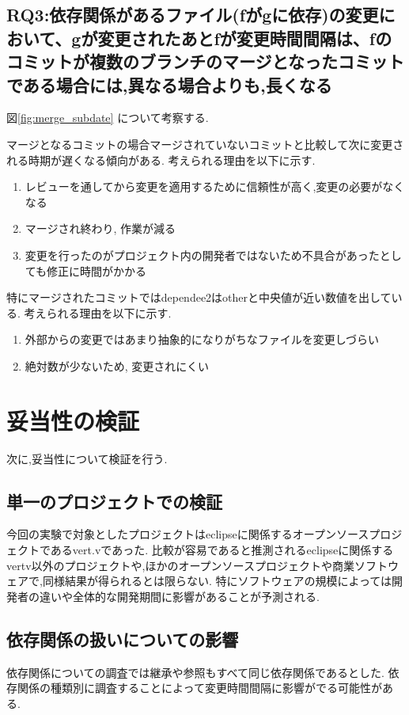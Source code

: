 \documentclass{fose2016}           %
\begin{document}
\subsection{RQ3:依存関係があるファイル(fがgに依存)の変更において、gが変更されたあとfが変更時間間隔は、fのコミットが複数のブランチのマージとなったコミットである場合には,異なる場合よりも,長くなる}
図\ref{fig:merge_subdate} について考察する.

マージとなるコミットの場合マージされていないコミットと比較して次に変更される時期が遅くなる傾向がある.
考えられる理由を以下に示す.
\begin{enumerate}
\item レビューを通してから変更を適用するために信頼性が高く,変更の必要がなくなる
\item マージされ終わり, 作業が減る
\item 変更を行ったのがプロジェクト内の開発者ではないため不具合があったとしても修正に時間がかかる
\end{enumerate}

特にマージされたコミットではdependee2はotherと中央値が近い数値を出している.
考えられる理由を以下に示す.
\begin{enumerate}
\item 外部からの変更ではあまり抽象的になりがちなファイルを変更しづらい
\item 絶対数が少ないため, 変更されにくい
\end{enumerate}

\section{妥当性の検証}\label{妥当性の検証}
次に,妥当性について検証を行う.

\subsection*{単一のプロジェクトでの検証}
今回の実験で対象としたプロジェクトはeclipseに関係するオープンソースプロジェクトであるvert.vであった.
比較が容易であると推測されるeclipseに関係するvertv以外のプロジェクトや,ほかのオープンソースプロジェクトや商業ソフトウェアで,同様結果が得られるとは限らない.
特にソフトウェアの規模によっては開発者の違いや全体的な開発期間に影響があることが予測される.

\subsection*{依存関係の扱いについての影響}
依存関係についての調査では継承や参照もすべて同じ依存関係であるとした.
依存関係の種類\cite{Kotani}別に調査することによって変更時間間隔に影響がでる可能性がある.
\end{document}
